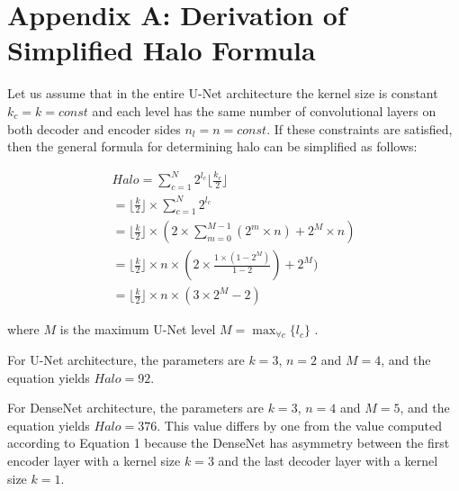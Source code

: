 %
%
%
%
%
%


\section{Appendix A: Derivation of Simplified Halo Formula}

Let us assume that in the entire U-Net architecture the kernel size is constant $k_{c} = k = const$ and each level has the same number of convolutional layers on both decoder and encoder sides $n_{l} = n = const$. If these constraints are satisfied, then the general formula for determining halo can be simplified as follows:

\begin{equation}
\begin{aligned}
Halo = \sum_{c=1}^{N} 2^{l_c} \lfloor \frac{k_c}{2} \rfloor \\
= \lfloor \frac{k}{2} \rfloor \times \sum_{c=1}^{N} 2^{l_c} \\
= \lfloor \frac{k}{2} \rfloor \times ( 2 \times \sum_{m=0}^{M-1} (2^{m} \times n) + 2^{M} \times n )  \\
= \lfloor \frac{k}{2} \rfloor \times n \times ( 2 \times \frac{1 \times (1 - 2^M) }{ 1- 2} ) + 2^{M} )  \\
= \lfloor \frac{k}{2} \rfloor \times n \times (3 \times 2^{M} - 2) 
\end{aligned}
\label{eq:halo2}
\end{equation}

where $M$ is the maximum U-Net level $M = \max_{\forall c}\{ l_{c} \}$ .

For U-Net architecture, the parameters are $k = 3$, $n=2$ and $M=4$, and the equation yields $Halo=92$.

For DenseNet architecture, the parameters are $k = 3$, $n=4$ and $M=5$, and the equation yields $Halo=376$. This value differs by one from the value computed according to Equation 1 because the DenseNet has asymmetry between the first encoder layer with a kernel size $k = 3$ and the last decoder layer with a kernel size $k = 1$.   



